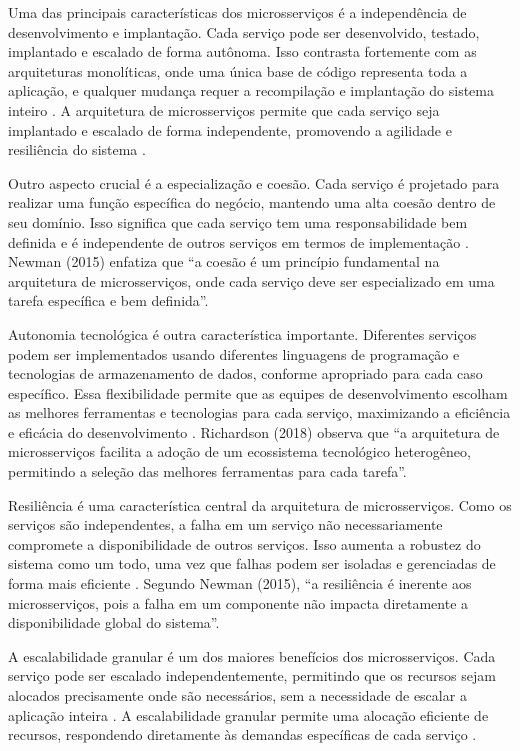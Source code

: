 Uma das principais características dos microsserviços é a independência de desenvolvimento e implantação. Cada serviço pode ser desenvolvido, testado, implantado e escalado de forma autônoma. Isso contrasta fortemente com as arquiteturas monolíticas, onde uma única base de código representa toda a aplicação, e qualquer mudança requer a recompilação e implantação do sistema inteiro \cite{fowler2014}. A arquitetura de microsserviços permite que cada serviço seja implantado e escalado de forma independente, promovendo a agilidade e resiliência do sistema \cite{dragoni2017}.

Outro aspecto crucial é a especialização e coesão. Cada serviço é projetado para realizar uma função específica do negócio, mantendo uma alta coesão dentro de seu domínio. Isso significa que cada serviço tem uma responsabilidade bem definida e é independente de outros serviços em termos de implementação \cite{richardson2018}. Newman (2015) enfatiza que “a coesão é um princípio fundamental na arquitetura de microsserviços, onde cada serviço deve ser especializado em uma tarefa específica e bem definida”.

Autonomia tecnológica é outra característica importante. Diferentes serviços podem ser implementados usando diferentes linguagens de programação e tecnologias de armazenamento de dados, conforme apropriado para cada caso específico. Essa flexibilidade permite que as equipes de desenvolvimento escolham as melhores ferramentas e tecnologias para cada serviço, maximizando a eficiência e eficácia do desenvolvimento \cite{fowler2014}. Richardson (2018) observa que “a arquitetura de microsserviços facilita a adoção de um ecossistema tecnológico heterogêneo, permitindo a seleção das melhores ferramentas para cada tarefa”.

Resiliência é uma característica central da arquitetura de microsserviços. Como os serviços são independentes, a falha em um serviço não necessariamente compromete a disponibilidade de outros serviços. Isso aumenta a robustez do sistema como um todo, uma vez que falhas podem ser isoladas e gerenciadas de forma mais eficiente \cite{dragoni2017}. Segundo Newman (2015), “a resiliência é inerente aos microsserviços, pois a falha em um componente não impacta diretamente a disponibilidade global do sistema”.

A escalabilidade granular é um dos maiores benefícios dos microsserviços. Cada serviço pode ser escalado independentemente, permitindo que os recursos sejam alocados precisamente onde são necessários, sem a necessidade de escalar a aplicação inteira \cite{richardson2018}. A escalabilidade granular permite uma alocação eficiente de recursos, respondendo diretamente às demandas específicas de cada serviço \cite{newman2019}.

